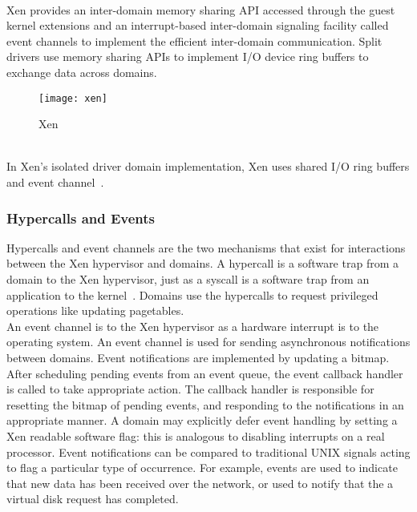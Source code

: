 \\[3mm]
Xen provides an inter-domain memory sharing API accessed through the guest kernel extensions and an interrupt-based inter-domain signaling facility called event channels to implement the efficient inter-domain communication. Split drivers use memory sharing APIs to implement I/O device ring buffers to exchange data across domains.
\begin{figure}[!h]
\centering
\texttt{[image: xen]}
\caption{Xen}
\label{xen}
\end{figure}
\\[3mm]
In Xen's isolated driver domain implementation, Xen uses shared I/O ring buffers and event channel~\cite{barham2003xen, Nikolaev:2013:VOS:2517349.2522719}.

\subsubsection*{Hypercalls and Events}
Hypercalls and event channels are the two mechanisms that exist for interactions between the Xen hypervisor and domains. A hypercall is a software trap from a domain to the Xen hypervisor, just as a syscall is a software trap from an application to the kernel~\cite{hypercall}. Domains use the hypercalls to request privileged operations like updating pagetables. 
\\[3mm]
An event channel is to the Xen hypervisor as a hardware interrupt is to the operating system. An event channel is used for sending asynchronous notifications between domains. Event notifications are implemented by updating a bitmap. After scheduling pending events from an event queue, the event callback handler is called to take appropriate action. The callback handler is responsible for resetting the bitmap of pending events, and responding to the notifications in an appropriate manner. A domain may explicitly defer event handling by setting a Xen readable software flag: this is analogous to disabling interrupts on a real processor. Event notifications can be compared to traditional UNIX signals acting to flag a particular type of occurrence. For example, events are used to indicate that new data has been received over the network, or used to notify that the a virtual disk request has completed. 

